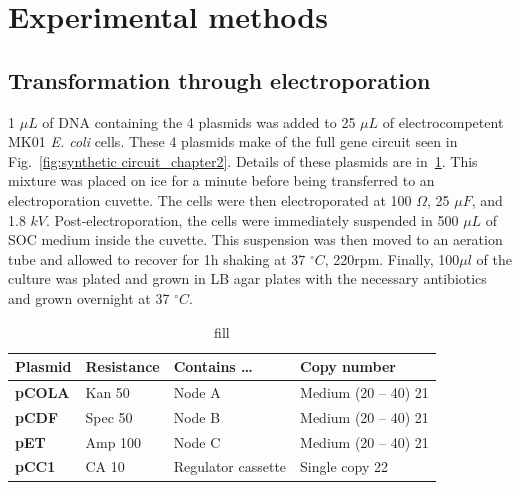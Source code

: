 


\section{Experimental methods}
\subsection{Transformation through electroporation}\label{electroporation}
1 $\mu L$ of DNA containing the 4 plasmids was added to 25 $\mu L$ of electrocompetent MK01 \textit{E. coli} cells.
These 4 plasmids make of the full gene circuit seen in Fig.~\ref{fig:synthetic circuit_chapter2}.
Details of these plasmids are in~\ref{tab:plasmid table}.
This mixture was placed on ice for a minute before being transferred to an electroporation cuvette.
The cells were then electroporated at 100 $\Omega$, 25 $\mu F$, and 1.8 $kV$.
Post-electroporation, the cells were immediately suspended in 500 $\mu L$ of SOC medium inside the cuvette.
This suspension was then moved to an aeration tube and allowed to recover for 1h shaking at 37 $^{\circ} C$, 220rpm.
Finally, 100$\mu l$ of the culture was plated and grown in LB agar plates with the necessary antibiotics and grown overnight at 37 $^{\circ} C$.

\begin{table}[H]
    \centering
    \begin{tabular}{llll}
        \toprule
        \textbf{Plasmid} & \textbf{Resistance} & \textbf{Contains …} & \textbf{Copy number} \\
        \midrule
        \textbf{pCOLA} & Kan 50 & Node A & Medium (20 – 40) 21 \\
        \textbf{pCDF} & Spec 50 & Node B & Medium (20 – 40) 21 \\
        \textbf{pET} & Amp 100 & Node C & Medium (20 – 40) 21 \\
        \textbf{pCC1} & CA 10 & Regulator cassette & Single copy 22 \\
        \bottomrule
    \end{tabular}
    \caption{fill}
    \label{tab:plasmid table}
\end{table}


